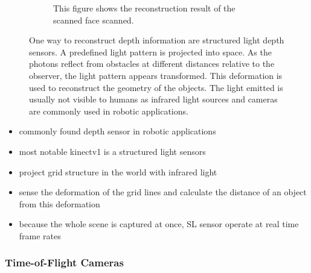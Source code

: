 \begin{figure}[H]
\begin{subfigure}[t]{0.45\textwidth}
        \caption{This figure shows the reconstruction result of the scanned face scanned\cite{sl_depthsensor_calibration}.}
    \end{subfigure}
    \caption[Visible light pattern used for structured-light depth sensors]{One way to reconstruct depth information are structured light depth sensors. A predefined light pattern is projected into space. As the photons reflect from obstacles at different distances relative to the observer, the light pattern appears transformed. This deformation is used to reconstruct the geometry of the objects. The light emitted is usually not visible to humans as infrared light sources and cameras are commonly used in robotic applications.\label{fig:sl_face}}
\end{figure}

\begin{itemize}
    \item commonly found depth sensor in robotic applications
    \item most notable kinectv1 is a structured light sensors
    \item project grid structure in the world with infrared light
    \item sense the deformation of the grid lines and calculate the distance of an object from this deformation
    \item because the whole scene is captured at once, SL sensor operate at real time frame rates
\end{itemize}

\subsubsection{Time-of-Flight Cameras}


